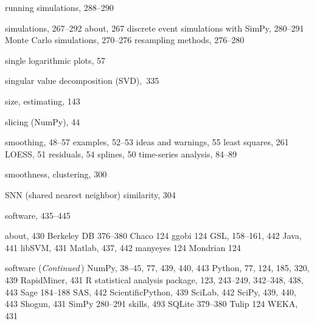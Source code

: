 \documentclass{Oreilly5980006}
\begin{document}
\begin{theindex}
    \subitem running simulations, 288--290
  \item simulations,  267--292
    \subitem about, 267
    \subitem discrete event simulations with SimPy, 280--291
    \subitem Monte Carlo simulations, 270--276
    \subitem resampling methods, 276--280
  \item single logarithmic plots, 57
  \item singular value decomposition (SVD),~335
  \item size, estimating, 143
  \item slicing (NumPy),  44
  \item smoothing, 48--57
    \subitem examples, 52--53
    \subitem ideas and warnings, 55
    \subitem least squares, 261
    \subitem LOESS, 51
    \subitem residuals, 54
    \subitem splines, 50
    \subitem time-series analysis, 84--89
  \item smoothness, clustering, 300
  \item SNN (shared nearest neighbor) similarity, 304
  \item software, 		435--445

    \subitem about, 430 
    \subitem Berkeley DB 376--380
    \subitem Chaco  124
    \subitem ggobi  124
    \subitem GSL, 158--161, 442
    \subitem Java, 441
    \subitem libSVM, 431
    \subitem Matlab, 437, 442
    \subitem manyeyes 124
    \subitem Mondrian 124
  \item software ({\it Continued\,})
    \subitem NumPy, 38--45, 77, 439, 440, 443
    \subitem Python, 77, 124, 185, 320, 439
    \subitem RapidMiner, 431
    \subitem R statistical analysis package, 123, 243--249, 342--348, 		438, 443
    \subitem Sage 184--188
    \subitem SAS, 442
    \subitem ScientificPython, 439
    \subitem SciLab, 442
    \subitem SciPy, 439, 440, 443
    \subitem Shogun, 431
    \subitem SimPy 280--291
    \subitem skills, 493
    \subitem SQLite 379--380
    \subitem Tulip 124
    \subitem WEKA, 431


\end{theindex}
\end{document}
